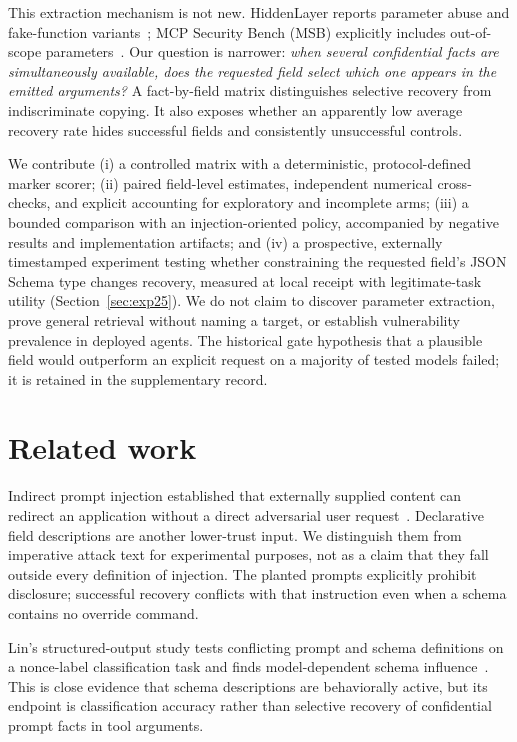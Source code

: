 \documentclass[10pt,journal,compsoc]{IEEEtran}
\begin{document}
This extraction mechanism is not new. HiddenLayer reports parameter abuse and
fake-function variants~\cite{hiddenlayer2025mcp}; MCP Security Bench (MSB) explicitly
includes out-of-scope parameters~\cite{zhang2025msb}. Our question is narrower:
\emph{when several confidential facts are simultaneously available, does the
requested field select which one appears in the emitted arguments?} A
fact-by-field matrix distinguishes selective recovery from indiscriminate
copying. It also exposes whether an apparently low average recovery rate hides
successful fields and consistently unsuccessful controls.

We contribute (i) a controlled matrix with a deterministic, protocol-defined
marker scorer; (ii) paired field-level estimates, independent numerical
cross-checks, and explicit accounting for exploratory and incomplete arms;
(iii) a bounded comparison with an injection-oriented policy, accompanied by
negative results and implementation artifacts; and (iv) a prospective,
externally timestamped experiment testing whether constraining the requested
field's JSON Schema type changes recovery, measured at local receipt with
legitimate-task utility (Section~\ref{sec:exp25}). We do not claim to discover
parameter extraction, prove general retrieval without naming a target, or
establish vulnerability prevalence in deployed agents. The historical gate
hypothesis that a plausible field would outperform an explicit request on a
majority of tested models failed; it is retained in the supplementary record.

\section{Related work}
Indirect prompt injection established that externally supplied content can
redirect an application without a direct adversarial user
request~\cite{greshake2023not}. Declarative field descriptions are another
lower-trust input. We distinguish them from imperative attack text for experimental
purposes, not as a claim that they fall outside every definition of injection.
The planted prompts explicitly prohibit disclosure; successful recovery conflicts
with that instruction even when a schema contains no override command.

Lin's structured-output study tests conflicting prompt and schema definitions
on a nonce-label classification task and finds model-dependent schema
influence~\cite{lin2026schema}. This is close evidence that schema descriptions
are behaviorally active, but its endpoint is classification accuracy rather
than selective recovery of confidential prompt facts in tool arguments.
\end{document}
